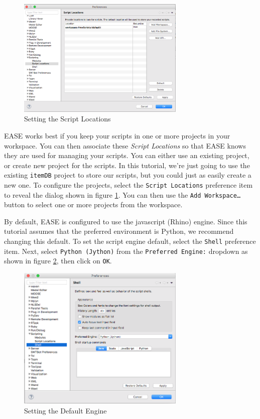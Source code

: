 \begin{figure}[!ht]
\centering
\includegraphics[width=8cm]{images/scripting-prefs1}
\caption{Setting the Script Locations}
\label{fig:prefs1}
\end{figure}

EASE works best if you keep your scripts in one or more projects in
your workspace. You can then associate these \emph{Script Locations} so
that EASE knows they are used for managing your scripts. You can either use an
existing project, or create new project for the scripts. In this tutorial, we're
just going to use the existing \texttt{itemDB} project to store our scripts, but
you could just as easily create a new one. To configure the projects, select the
\texttt{Script Locations} preference item to reveal the dialog shown in figure
\ref{fig:prefs1}. You can then use the \texttt{Add Workspace\ldots} button to
select one or more projects from the workspace.

By default, EASE is configured to use the javascript (Rhino) engine.
Since this tutorial assumes that the preferred environment is Python, we recommend changing
this default. To set the script engine default, select the
\texttt{Shell} preference item. Next, select \texttt{Python (Jython)} from
the \texttt{Preferred Engine:} dropdown as shown in figure \ref{fig:prefs2},
then click on \texttt{OK}.

\begin{figure}[!ht]
\centering
\includegraphics[width=8cm]{images/scripting-prefs2}
\caption{Setting the Default Engine}
\label{fig:prefs2}
\end{figure}

